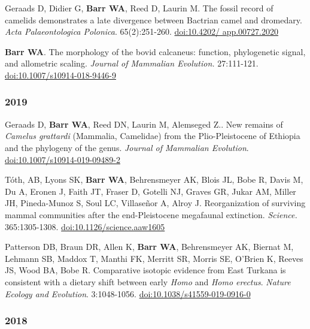 \item Geraads D, Didier G, {\bfseries Barr WA}, Reed D, Laurin M. The fossil record of camelids demonstrates a late divergence between Bactrian camel and dromedary. \emph{Acta Palaeontologica Polonica}. 65(2):251-260. \href{https://doi.org/10.4202/app.00727.2020}{doi:10.4202/ app.00727.2020}

\item {\bfseries Barr WA}. The morphology of the bovid calcaneus: function, phylogenetic signal, and allometric scaling. \emph{Journal of Mammalian Evolution.}  27:111-121. \href{https://dx.doi.org/10.1007/s10914-018-9446-9}{doi:10.1007/s10914-018-9446-9}

\subsubsection*{2019}

\item Geraads D, {\bfseries Barr WA}, Reed DN, Laurin M, Alemseged Z.. New remains of \emph{Camelus grattardi} (Mammalia, Camelidae) from the Plio-Pleistocene of Ethiopia and the phylogeny of the genus. \emph{Journal of Mammalian Evolution}. \href{https://doi.org/10.1007/s10914-019-09489-2}{doi:10.1007/s10914-019-09489-2}

\item Tóth, AB, Lyons SK, {\bfseries Barr WA}, Behrensmeyer AK, Blois JL, Bobe R, Davis M, Du A, Eronen J, Faith JT, Fraser D, Gotelli NJ, Graves GR, Jukar AM, Miller JH, Pineda-Munoz S, Soul LC, Villaseñor A, Alroy J. Reorganization of surviving mammal communities after the end-Pleistocene megafaunal extinction. \emph{Science.} 365:1305-1308. \href{https://dx.doi.org/10.1126/science.aaw1605 }{doi:10.1126/science.aaw1605}

\item Patterson DB, Braun DR, Allen K, {\bfseries Barr WA}, Behrensmeyer AK, Biernat M, Lehmann SB, Maddox T, Manthi FK, Merritt SR, Morris SE, O'Brien K, Reeves JS, Wood BA, Bobe R. Comparative isotopic evidence from East Turkana is consistent with a dietary shift between early \emph{Homo} and \emph{Homo erectus}. \emph{Nature Ecology and Evolution}. 3:1048-1056. \href{https://dx.doi.org/10.1038/s41559-019-0916-0}{doi:10.1038/s41559-019-0916-0}

\subsubsection*{2018}

